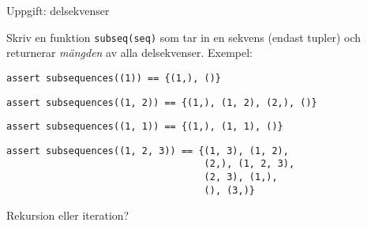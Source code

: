 \documentclass{beamer}
\begin{document}
  \begin{frame}[fragile]{Uppgift: delsekvenser}

    Skriv en funktion \texttt{subseq(seq)} som tar in en sekvens (endast tupler)
    och returnerar \textit{mängden} av alla delsekvenser. Exempel:

    \pause{}
    \begin{lstlisting}
assert subsequences((1)) == {(1,), ()}
    \end{lstlisting}
    \pause{}
    \begin{lstlisting}
assert subsequences((1, 2)) == {(1,), (1, 2), (2,), ()}
    \end{lstlisting}
    \pause{}
    \begin{lstlisting}
assert subsequences((1, 1)) == {(1,), (1, 1), ()}
    \end{lstlisting}
    \pause{}
    \begin{lstlisting}
assert subsequences((1, 2, 3)) == {(1, 3), (1, 2),
                                   (2,), (1, 2, 3),
                                   (2, 3), (1,),
                                   (), (3,)}
    \end{lstlisting}

    \pause{}
    Rekursion eller iteration?

  \end{frame}
\end{document}

